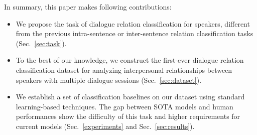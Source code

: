 In summary, this paper makes following contributions:
\begin{itemize}
	\item We propose the task of dialogue relation classification for speakers, different from the previous intra-sentence or inter-sentence relation classification tasks (Sec.~\ref{sec:task}).
	\item To the best of our knowledge, we construct the first-ever dialogue relation classification dataset for analyzing interpersonal relationships between speakers with multiple dialogue sessions (Sec.~\ref{sec:dataset}). %
	\item We establish a set of classification baselines on our dataset using standard learning-based techniques. The gap between SOTA models and human performances show the difficulty of this task and higher requirements for current models (Sec.~\ref{experiments} and Sec.~\ref{sec:results}).
\end{itemize}
